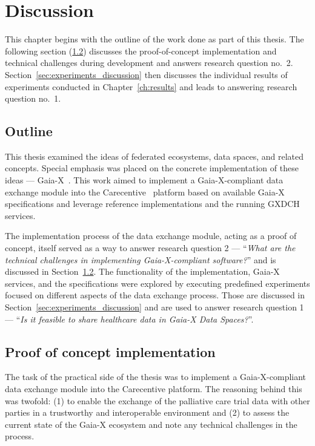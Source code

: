 \chapter{Discussion}\label{ch:discussion}

\begin{chapterabstract}
    This chapter begins with the outline of the work done as part of this thesis.
    The following section (\ref{sec:proof-of-concept-implementation}) discusses the proof-of-concept implementation and technical challenges during development and answers research question no.~2.
    Section~\ref{sec:experiments_discussion} then discusses the individual results of experiments conducted in Chapter~\ref{ch:results} and leads to answering research question no.~1.
\end{chapterabstract}

\section{Outline}\label{sec:discussion_outline}

This thesis examined the ideas of federated ecosystems, data spaces, and related concepts.
Special emphasis was placed on the concrete implementation of these ideas --- Gaia-X~\cite{gaiax}.
This work aimed to implement a Gaia-X-compliant data exchange module into the Carecentive~\cite{carecentive} platform based on available Gaia-X specifications and leverage reference implementations and the running GXDCH services.

The implementation process of the data exchange module, acting as a proof of concept, itself served as a way to answer research question 2 --- ``\textit{What are the technical challenges in implementing Gaia-X-compliant software?}'' and is discussed in Section~\ref{sec:proof-of-concept-implementation}.
The functionality of the implementation, Gaia-X services, and the specifications were explored by executing predefined experiments focused on different aspects of the data exchange process.
Those are discussed in Section~\ref{sec:experiments_discussion} and are used to answer research question 1 --- ``\textit{Is it feasible to share healthcare data in Gaia-X Data Spaces?}''.

\section{Proof of concept implementation}\label{sec:proof-of-concept-implementation}

The task of the practical side of the thesis was to implement a Gaia-X-compliant data exchange module into the Carecentive platform.
The reasoning behind this was twofold: (1) to enable the exchange of the palliative care trial data with other parties in a trustworthy and interoperable environment and (2) to assess the current state of the Gaia-X ecosystem and note any technical challenges in the process.

